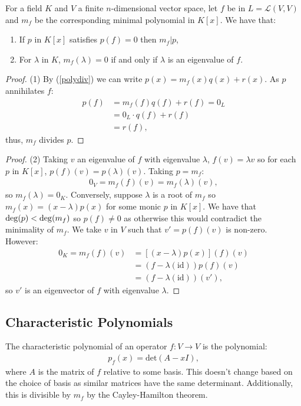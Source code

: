 For a field $K$ and $V$ a finite $n$-dimensional vector space, let $f$ be in
$L = \mathcal{L}(V, V)$ and $m_f$ be the corresponding minimal polynomial in $K[x]$.
We have that: \begin{enumerate}
  \item If $p$ in $K[x]$ satisfies $p(f) = 0$ then $m_f | p$,
  \item For $\lambda$ in $K$, $m_f(\lambda) = 0$ if and only if 
  $\lambda$ is an eigenvalue of $f$.
\end{enumerate}
\begin{proof}
    (1) By (\ref{polydiv}) we can write $p(x) = m_f(x)q(x) + r(x)$. As
    $p$ annihilates $f$: \begin{align*}
        p(f) &= m_f(f)q(f) + r(f) = 0_L \\
        &= 0_L \cdot q(f) + r(f) \\
        &= r(f),
    \end{align*} thus, $m_f$ divides $p$.
\end{proof}
\begin{proof}
    (2) Taking $v$ an eigenvalue of $f$ with eigenvalue $\lambda$, 
    $f(v) = \lambda v$ so for each $p$ in $K[x]$, $p(f)(v) = p(\lambda)(v)$.
    Taking $p = m_f$: \begin{gather*}
        0_V = m_f(f)(v) = m_f(\lambda)(v),
    \end{gather*} so $m_f(\lambda) = 0_K$. Conversely, suppose $\lambda$ is
    a root of $m_f$ so $m_f(x) = (x - \lambda)p(x)$ for some monic $p$ in $K[x]$.
    We have that $\operatorname{deg}(p) < \operatorname{deg}(m_f)$ so $p(f) \neq 0$ as otherwise this would
    contradict the minimality of $m_f$. We take $v$ in $V$ such that 
    $v' = p(f)(v)$ is non-zero. However: \begin{align*}
        0_K = m_f(f)(v) &= [(x - \lambda)p(x)](f)(v)\\
        &= (f - \lambda(\text{id}))p(f)(v) \\
        &= (f - \lambda(\text{id}))(v'),
    \end{align*} so $v'$ is an eigenvector of $f$ with eigenvalue $\lambda$.
\end{proof}

\subsection{Characteristic Polynomials}

The characteristic polynomial of an operator $f : V \to V$ is the polynomial: \begin{gather*}
  p_f(x) = \text{det}(A - xI),
\end{gather*} where $A$ is the matrix of $f$ relative to some basis.
This doesn't change based on the choice of basis as similar matrices have the same determinant.
Additionally, this is divisible by $m_f$ by the Cayley-Hamilton theorem.


